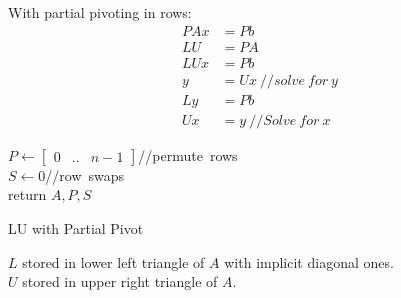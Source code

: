 \documentclass[8pt,letter]{article}
\begin{document}
\begin{multicols*}{2}
    With partial pivoting in rows:
    \begin{align*}
      PAx &= Pb\\
      LU &= PA\\
      LUx &= Pb\\
      y &= Ux\ //solve\ for\ y\\
      Ly &= Pb\\
      Ux &= y\ //Solve\ for\ x
    \end{align*}

    \begin{algorithm}[H]
      $P \leftarrow \begin{bmatrix} 0 & .. & n-1 \end{bmatrix}$//permute\ rows\\
      $S \leftarrow 0$//row\ swaps\\
      return $A, P, S$
      \caption{LU with Partial Pivot \label{Algo_LU_partial_pivot}}
    \end{algorithm}

    $L$ stored in lower left triangle of $A$ with implicit diagonal ones.\\
    
    $U$ stored in upper right triangle of $A$.\\
    
    \vfill\null
    \columnbreak


\end{multicols*}
\end{document}
